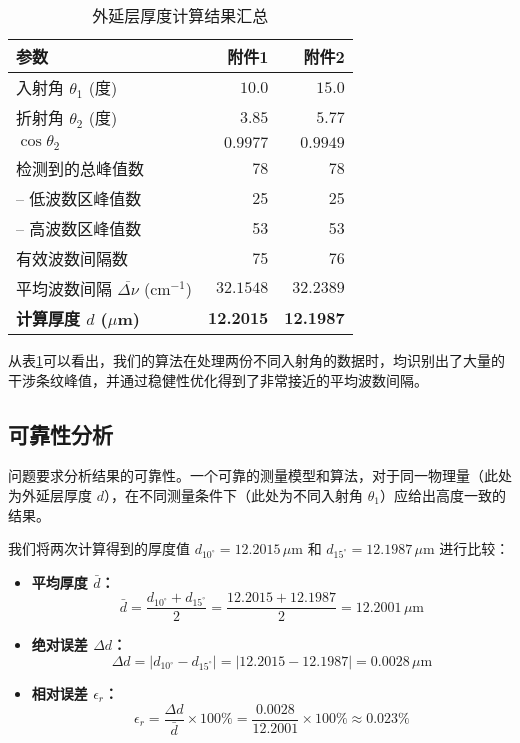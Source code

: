 \documentclass{ctexart} %
\begin{document}
\begin{table}[htbp]
    \centering
    \caption{外延层厚度计算结果汇总}
    \label{tab:results_q2}
    \begin{tabular}{lrr}
        \toprule
        \textbf{参数}                               & \textbf{附件1}     & \textbf{附件2}     \\
        \midrule
        入射角 $\theta_1$ (度)                        & $10.0$           & $15.0$           \\
        折射角 $\theta_2$ (度)                        & $3.85$           & $5.77$           \\
        $\cos\theta_2$                            & $0.9977$         & $0.9949$         \\
        检测到的总峰值数                                  & 78               & 78               \\
        \quad -- 低波数区峰值数                          & 25               & 25               \\
        \quad -- 高波数区峰值数                          & 53               & 53               \\
        有效波数间隔数                                   & 75               & 76               \\
        平均波数间隔 $\overline{\Delta\nu}$ (cm$^{-1}$) & $32.1548$        & $32.2389$        \\
        \textbf{计算厚度 $d$ ($\mu$m)}                & \textbf{12.2015} & \textbf{12.1987} \\
        \bottomrule
    \end{tabular}
\end{table}

从表\ref{tab:results_q2}可以看出，我们的算法在处理两份不同入射角的数据时，均识别出了大量的干涉条纹峰值，并通过稳健性优化得到了非常接近的平均波数间隔。

\subsection{可靠性分析}
问题要求分析结果的可靠性。一个可靠的测量模型和算法，对于同一物理量（此处为外延层厚度 $d$），在不同测量条件下（此处为不同入射角 $\theta_1$）应给出高度一致的结果。

我们将两次计算得到的厚度值 $d_{10^\circ} = 12.2015 \, \mu\text{m}$ 和 $d_{15^\circ} = 12.1987 \, \mu\text{m}$ 进行比较：
\begin{itemize}
    \item \textbf{平均厚度 $\bar{d}$：}
          $$ \bar{d} = \frac{d_{10^\circ} + d_{15^\circ}}{2} = \frac{12.2015 + 12.1987}{2} = 12.2001 \, \mu\text{m} $$
    \item \textbf{绝对误差 $\Delta d$：}
          $$ \Delta d = |d_{10^\circ} - d_{15^\circ}| = |12.2015 - 12.1987| = 0.0028 \, \mu\text{m} $$
    \item \textbf{相对误差 $\epsilon_r$：}
          $$ \epsilon_r = \frac{\Delta d}{\bar{d}} \times 100\% = \frac{0.0028}{12.2001} \times 100\% \approx 0.023\% $$
\end{itemize}
\end{document}
